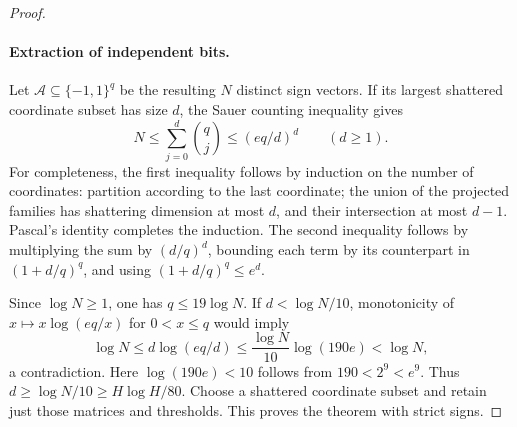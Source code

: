 \documentclass[11pt]{article}
\begin{document}
\begin{proof}
\paragraph{Extraction of independent bits.}
Let $\mathcal A\subseteq\{-1,1\}^q$ be the resulting $N$ distinct
sign vectors. If its largest shattered coordinate subset has size $d$,
the Sauer counting inequality gives
\[
N\leq\sum_{j=0}^d\binom qj\leq(eq/d)^d\qquad(d\geq1).
\]
For completeness, the first inequality follows by induction on the
number of coordinates: partition according to the last coordinate;
the union of the projected families has shattering dimension at most
$d$, and their intersection at most $d-1$. Pascal's identity completes
the induction. The second inequality follows by multiplying the sum by
$(d/q)^d$, bounding each term by its counterpart in
$(1+d/q)^q$, and using $(1+d/q)^q\leq e^d$.

Since $\log N\geq1$, one has $q\leq19\log N$.
If $d<\log N/10$, monotonicity of
$x\mapsto x\log(eq/x)$ for $0<x\leq q$ would imply
\[
\log N\leq d\log(eq/d)
\leq\frac{\log N}{10}\log(190e)<\log N,
\]
a contradiction. Here $\log(190e)<10$ follows from $190<2^9<e^9$.
Thus $d\geq\log N/10\geq H\log H/80$.
Choose a shattered coordinate subset and retain just those matrices
and thresholds. This proves the theorem with strict signs.
\end{proof}
\end{document}
